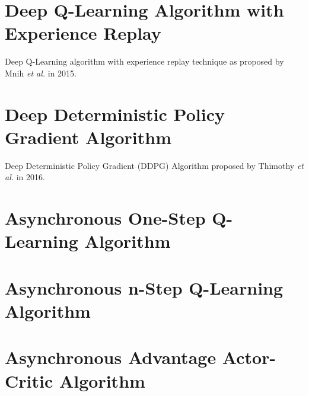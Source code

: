 \documentclass[a4paper,oneside,12pt]{report}
\begin{document}
\begin{appendices}
\chapter{Deep Q-Learning Algorithm with Experience Replay}

Deep Q-Learning algorithm with experience replay technique as proposed by Mnih \textit{et al.} in 2015.

\chapter{Deep Deterministic Policy Gradient Algorithm}

Deep Deterministic Policy Gradient (DDPG) Algorithm proposed by Thimothy \textit{et al.} in 2016.

\chapter{Asynchronous One-Step Q-Learning Algorithm}

\chapter{Asynchronous n-Step Q-Learning Algorithm}

\chapter{Asynchronous Advantage Actor-Critic Algorithm}
\end{appendices}
\end{document}
